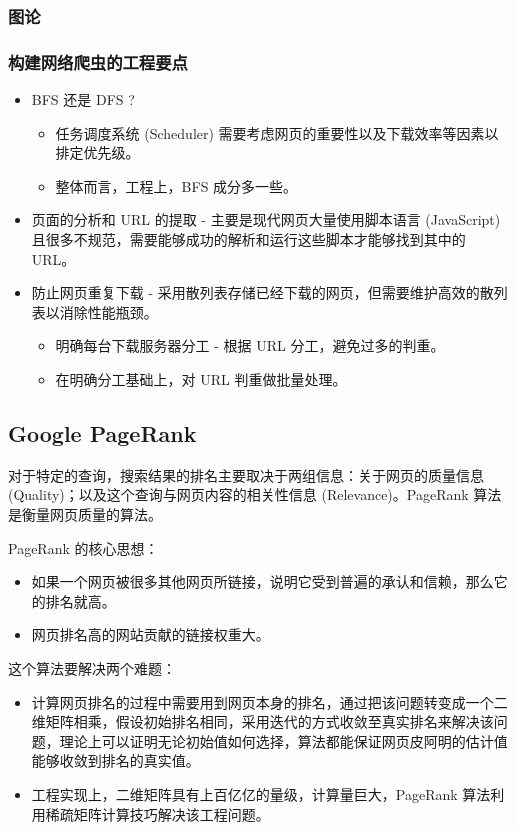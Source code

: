\documentclass[11pt]{article}
\begin{document}
\subsubsection{图论}
\label{sec:org48a42ec}

\subsubsection{构建网络爬虫的工程要点}
\label{sec:org901418f}
\begin{itemize}
\item BFS 还是 DFS ?
\begin{itemize}
\item 任务调度系统 (Scheduler) 需要考虑网页的重要性以及下载效率等因素以排定优先级。
\item 整体而言，工程上，BFS 成分多一些。
\end{itemize}
\item 页面的分析和 URL 的提取 - 主要是现代网页大量使用脚本语言 (JavaScript) 且很多不规范，需要能够成功的解析和运行这些脚本才能够找到其中的 URL。
\item 防止网页重复下载 - 采用散列表存储已经下载的网页，但需要维护高效的散列表以消除性能瓶颈。
\begin{itemize}
\item 明确每台下载服务器分工 - 根据 URL 分工，避免过多的判重。
\item 在明确分工基础上，对 URL 判重做批量处理。
\end{itemize}
\end{itemize}

\subsection{Google PageRank}
\label{sec:org2867e6b}
对于特定的查询，搜索结果的排名主要取决于两组信息：关于网页的质量信息 (Quality)；以及这个查询与网页内容的相关性信息 (Relevance)。PageRank 算法是衡量网页质量的算法。

PageRank 的核心思想：
\begin{itemize}
\item 如果一个网页被很多其他网页所链接，说明它受到普遍的承认和信赖，那么它的排名就高。
\item 网页排名高的网站贡献的链接权重大。
\end{itemize}

这个算法要解决两个难题：
\begin{itemize}
\item 计算网页排名的过程中需要用到网页本身的排名，通过把该问题转变成一个二维矩阵相乘，假设初始排名相同，采用迭代的方式收敛至真实排名来解决该问题，理论上可以证明无论初始值如何选择，算法都能保证网页皮阿明的估计值能够收敛到排名的真实值。
\item 工程实现上，二维矩阵具有上百亿亿的量级，计算量巨大，PageRank 算法利用稀疏矩阵计算技巧解决该工程问题。
\end{itemize}
\end{document}
